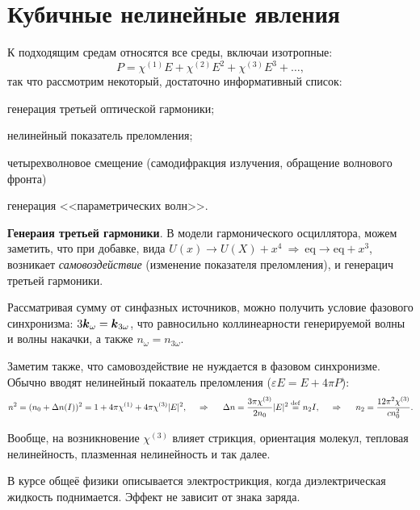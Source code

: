 \section{Кубичные нелинейные явления}



К подходящим средам относятся все среды, включаи изотропные:
\begin{equation*}
    P = \chi^{(1)} E + \chi^{(2)} E^2 + \chi^{(3)} E^3 + \ldots,
\end{equation*}
так что рассмотрим некоторый, достаточно информативный список:
\vspace{-2mm}
\begin{itemize*}
    \item генерация третьей оптической гармоники;
    \item нелинейный показатель преломления;
    \item четырехволновое смещение (самодифракция излучения, обращение волнового фронта)
    \item генерация <<параметрических волн>>. 
\end{itemize*}


\textbf{Генераия третьей гармоники}.  В модели гармонического осциллятора, можем заметить, что при добавке, вида $U(x) \to U(X) + x^4 \ \Rightarrow \ \text{eq} \to \text{eq}+ x^3$, возникает \textit{самовоздействие} (изменение показателя преломления), и генерацич третьей гармоники. 


Рассматривая сумму от синфазных источников, можно получить условие фазового синхронизма: $3 \mbox{\boldmath $k$}_{\omega} = \mbox{\boldmath $k$}_{3 \omega}$, что равносильно коллинеарности генерируемой волны и волны накачки, а также $n_\omega = n_{3 \omega}$. 


Заметим также, что самовоздействие не нуждается в фазовом синхронизме. Обычно вводят нелинейный покаатель преломления ($\varepsilon E = E + 4 \pi P$):
\begin{equation*}
    n^2 = (n_0 + \Delta n(I))^2 = 1 + 4 \pi \chi^{(1)} + 4 \pi \chi^{(3)} |E|^2,
    \hspace{0.5cm} \Rightarrow \hspace{0.5cm}
    \Delta n = \frac{3 \pi \chi^{(3)}}{2 n_0} |E|^2 \overset{\mathrm{def}}{=} n_2 I,
    \hspace{0.5cm} \Rightarrow \hspace{0.5cm}
    n_2 = \frac{12 \pi^2 \chi^{(3)}}{c n_0^2}.
\end{equation*}

Вообще, на возникновение $\chi^{(3)}$ влияет стрикция, ориентация молекул, тепловая нелинейность, плазменная нелинейность и так далее. 


В курсе общеё физики описывается электрострикция, когда диэлектрическая жидкость поднимается. 
Эффект не зависит от знака заряда. 
